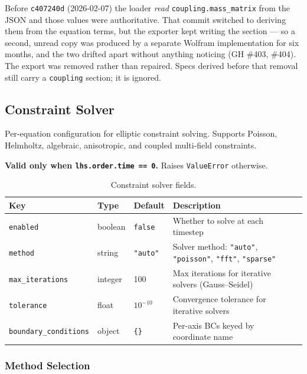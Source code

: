 Before \texttt{c407240d} (2026-02-07) the loader \emph{read}
\texttt{coupling.mass\_matrix} from the JSON and those values were
authoritative. That commit switched to deriving them from the equation terms,
but the exporter kept writing the section --- so a second, unread copy was
produced by a separate Wolfram implementation for six months, and the two
drifted apart without anything noticing (GH \#403, \#404). The export was
removed rather than repaired. Specs derived before that removal still carry a
\texttt{coupling} section; it is ignored.


\subsection{Constraint Solver}
\label{sec:json-constraint-solver}

Per-equation configuration for elliptic constraint solving. Supports Poisson, Helmholtz, algebraic, anisotropic, and coupled multi-field constraints.

\textbf{Valid only when \texttt{lhs.order.time == 0}.} Raises \texttt{ValueError} otherwise.

\begin{table}[htbp]
\centering
\caption{Constraint solver fields.}
\label{tab:json-constraint-solver}
\begin{tabular}{@{}lllll@{}}
\toprule
Key & Type & Default & Description \\
\midrule
\texttt{enabled}             & boolean & \texttt{false}  & Whether to solve at each timestep \\
\texttt{method}              & string  & \texttt{"auto"} & Solver method: \texttt{"auto"}, \texttt{"poisson"}, \texttt{"fft"}, \texttt{"sparse"} \\
\texttt{max\_iterations}      & integer & 100    & Max iterations for iterative solvers (Gauss--Seidel) \\
\texttt{tolerance}           & float   & $10^{-10}$ & Convergence tolerance for iterative solvers \\
\texttt{boundary\_conditions} & object  & \texttt{\{\}} & Per-axis BCs keyed by coordinate name \\
\bottomrule
\end{tabular}
\end{table}

\subsubsection{Method Selection}
\label{sec:json-constraint-method}


